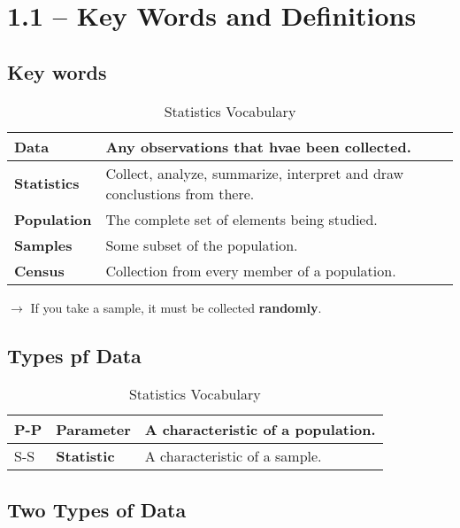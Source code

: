 
\chapter{1.1 -- Key Words and Definitions}

\section{Key words}

\begin{table}[htbp]
    \centering
    \begin{tabular}{>{\bfseries}l l}
        \toprule
        Data & Any observations that hvae been collected. \\
        \midrule
        Statistics & Collect, analyze, summarize, interpret and draw conclustions from there. \\
        \midrule
        Population & The complete set of elements being studied. \\
        \midrule
        Samples & Some subset of the population.\\
        \midrule
        Census & Collection from every member of a population. \\
        \bottomrule
    \end{tabular}
    \caption{Statistics Vocabulary}
    \label{tab:vocab}
\end{table}

$\to$ If you take a sample, it must be collected \textbf{randomly}.

\section{Types pf Data}

\begin{table}[htbp]
    \centering
    \begin{tabular}{l |>{\bfseries}l l}
        \toprule
        P-P & Parameter & A characteristic of a population. \\
        \midrule
        S-S & Statistic & A characteristic of a sample. \\
        \bottomrule
    \end{tabular}
    \caption{Statistics Vocabulary}
    \label{tab:vocab-2}
\end{table}

\section{Two Types of Data}

